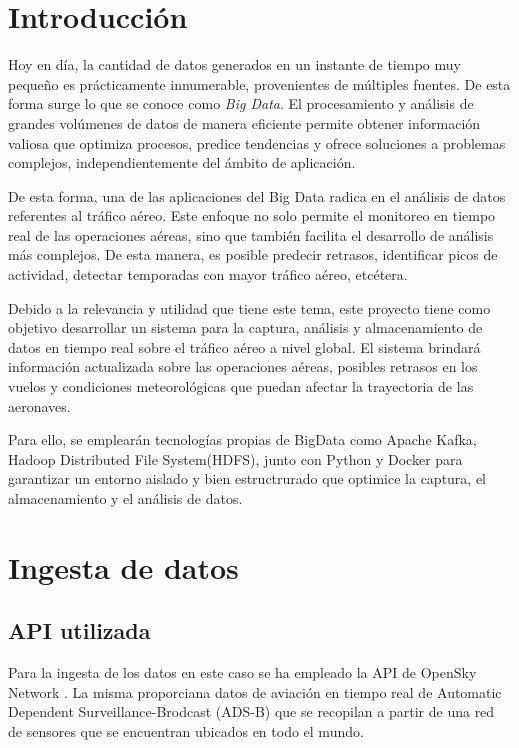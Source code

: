 \documentclass{article}
\begin{document}
\section{Introducción}
Hoy en día, la cantidad de datos generados en un instante de tiempo muy pequeño es prácticamente innumerable, provenientes de múltiples fuentes. De esta forma surge lo que se conoce como \textit{Big Data}.
El procesamiento y análisis de grandes volúmenes de datos de manera eficiente permite obtener información valiosa que optimiza procesos, predice tendencias y ofrece soluciones a problemas complejos, independientemente del ámbito de aplicación.

De esta forma, una de las aplicaciones del Big Data radica en el análisis de datos referentes al tráfico aéreo. Este enfoque no solo permite el monitoreo en tiempo real de las operaciones aéreas, sino que también facilita el desarrollo de análisis más complejos. De esta manera, es posible predecir retrasos, identificar picos de actividad, detectar temporadas con mayor tráfico aéreo, etcétera.

Debido a la relevancia y utilidad que tiene este tema, este proyecto tiene como objetivo desarrollar un sistema para la captura, análisis y almacenamiento de datos en tiempo real sobre el tráfico aéreo a nivel global. El sistema brindará información actualizada sobre las operaciones aéreas, posibles retrasos en los vuelos y condiciones meteorológicas que puedan afectar la trayectoria de las aeronaves.  

Para ello, se emplearán tecnologías propias de BigData como Apache Kafka, Hadoop Distributed File System(HDFS), junto con Python y Docker para garantizar un entorno aislado y bien estructrurado que optimice la captura, el almacenamiento y el análisis de datos. 
\newpage

\section{Ingesta de datos}

\subsection{API utilizada}

Para la ingesta de los datos en este caso se ha empleado la API de OpenSky Network \cite{Schaefer2014}. La misma proporciana datos de aviación en tiempo real de Automatic Dependent Surveillance-Brodcast (ADS-B) que se recopilan a
partir de una red de sensores que se encuentran ubicados en todo el mundo.
\end{document}
